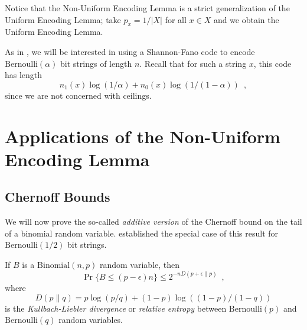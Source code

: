 \documentclass{patmorin}
\begin{document}
Notice that the Non-Uniform Encoding Lemma is a strict generalization
of the Uniform Encoding Lemma; take $p_x=1/|X|$ for all $x\in X$
and we obtain the Uniform Encoding Lemma.

As in , we will be interested in using a
Shannon-Fano code to encode $\mathrm{Bernoulli}(\alpha)$ bit strings of
length $n$. Recall that for such a string $x$, this code has length
\[
n_1(x) \log (1/\alpha) + n_0(x) \log(1/(1 - \alpha)) \enspace ,
\]
since we are not concerned with ceilings.

\section{Applications of the Non-Uniform Encoding Lemma}

\subsection{Chernoff Bounds}

We will now prove the so-called \emph{additive version} of the
Chernoff bound on the tail of a binomial random
variable.  established the special case of this
result for $\mathrm{Bernoulli}(1/2)$ bit strings.

\begin{thm}
  If $B$ is a $\mathrm{Binomial}(n,p)$ random variable, then
  \[
  \Pr\{B\le(p-\epsilon)n\} \le 2^{-nD(p+\epsilon \| p)} \enspace ,
  \]
  where 
  \[ 
  D(p \| q)= p\log (p/q) + (1-p)\log ((1 - p)/(1 - q))
  \]
  is the \emph{Kullbach-Liebler divergence} or \emph{relative entropy}
  between $\mathrm{Bernoulli}(p)$ and $\mathrm{Bernoulli}(q)$ random
  variables.
\end{thm}
\end{document}
